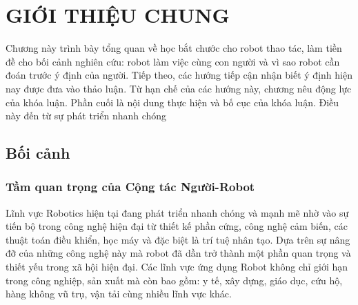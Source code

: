 \chapter{GIỚI THIỆU CHUNG}
\label{chap:introduction}

Chương này trình bày tổng quan về học bắt chước cho robot thao tác, làm tiền đề cho bối cảnh nghiên cứu: robot làm việc cùng con người và vì sao robot cần đoán trước ý định của người. Tiếp theo, các hướng tiếp cận nhận biết ý định hiện nay được đưa vào thảo luận. Từ hạn chế của các hướng này, chương nêu động lực của khóa luận. Phần cuối là nội dung thực hiện và bố cục của khóa luận. Điều này đến từ sự phát triển nhanh chóng 

\section{Bối cảnh}
\label{sec:intro-background}

\subsection{Tầm quan trọng của Cộng tác Người-Robot}

Lĩnh vực Robotics hiện tại đang phát triển nhanh chóng và mạnh mẽ nhờ vào sự tiến bộ trong công nghệ hiện đại từ thiết kế phần cứng, công nghệ cảm biến, các thuật toán điều khiển, học máy và đặc biệt là trí tuệ nhân tạo. Dựa trên sự nâng đỡ của những công nghệ này mà robot đã dần trở thành một phần quan trọng và thiết yếu trong xã hội hiện đại. Các lĩnh vực ứng dụng Robot không chỉ giới hạn trong công nghiệp, sản xuất mà còn bao gồm: y tế, xây dựng, giáo dục, cứu hộ, hàng không vũ trụ, vận tải cùng nhiều lĩnh vực khác. 

